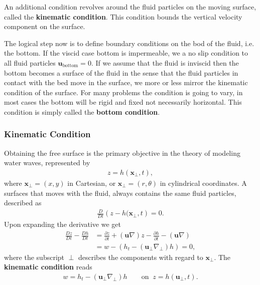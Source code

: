 An additional condition revolves around the fluid particles on the moving
surface, called the \textbf{kinematic condition}. This condition bounds
the vertical velocity component on the surface.

The logical step now is to define boundary conditions on the bod of the
fluid, i.e. the bottom. If the viscid case bottom is impermeable, we a no
slip condition to all fluid particles $\mathbf{u}_\text{bottom}= 0$. If we
assume that the fluid is inviscid then the bottom becomes a surface of the
fluid in the sense that the fluid particles in contact with the bed move in
the surface, we more or less mirror the kinematic condition of the surface.
For many problems the condition is going to vary, in most cases the bottom
will be rigid and fixed not necessarily horizontal. This condition is simply
called the \textbf{bottom condition}.
\subsubsection{Kinematic Condition}
Obtaining the free surface is the primary objective in the theory of modeling
water waves, represented by
\begin{align}
    z = h(\mathbf{x}_\perp, t),
\end{align}
where $\mathbf{x}_\perp = (x, y)$ in Cartesian, or $\mathbf{x}_\perp = (r,
\theta)$ in cylindrical coordinates. A surfaces that moves with the fluid,
always contains the same fluid particles, described as
\begin{align}
    \frac{D}{Dt}\left(z - h(\mathbf{x}_\perp, t  \right) = 0.
\end{align}
Upon expanding the derivative we get
\begin{align}
    \frac{Dz}{Dt} - \frac{Dh}{Dt}
    &= \frac{\partial z}{\partial t}+
    (\mathbf{u}\nabla)z - \frac{\partial h}{\partial t} -(\mathbf{u}\nabla)\\
    &= w - \left(h_t - (\mathbf{u}_\perp \nabla_\perp) h\right) = 0,
\end{align}
where the subscript $\perp$ describes the components with regard to
$\mathbf{x}_\perp$. The \textbf{kinematic condition} reads
\begin{align}
    w = h_t - (\mathbf{u}_\perp \nabla_\perp) h \qquad \text{on}\;\;
    z=h(\mathbf{u}_\perp, t).
\end{align}

